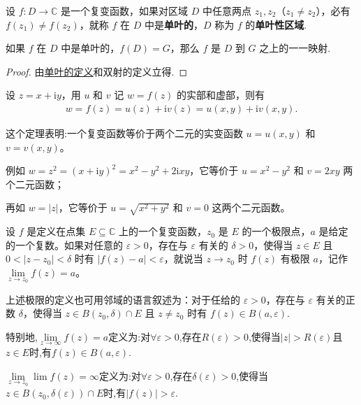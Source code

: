 \documentclass[../../main.tex]{subfiles}%
\begin{document}
\begin{definition}\label{definition:单叶性区域}
设 \( f:D \to \mathbb{C} \) 是一个复变函数，如果对区域 \( D \) 中任意两点 \( z_1, z_2 \)（\( z_1 \neq z_2 \)），必有 \( f(z_1) \neq f(z_2) \)，就称 \( f \) 在 \( D \) 中是\textbf{单叶的}，\( D \) 称为 \( f \) 的\textbf{单叶性区域}.
\end{definition}

\begin{proposition}
如果 \( f \) 在 \( D \) 中是单叶的，\( f(D) = G \)，那么 \( f \) 是 \( D \) 到 \( G \) 之上的一一映射.
\end{proposition}
\begin{proof}
由\hyperref[definition:单叶性区域]{单叶的定义}和双射的定义立得.
\end{proof}

\begin{theorem}
设 $z = x + \mathrm{i}y$，用 $u$ 和 $v$ 记 $w = f(z)$ 的实部和虚部，则有
\begin{align*}
w = f(z) = u(z) + \mathrm{i}v(z)= u(x, y) + \mathrm{i}v(x, y).
\end{align*}
\end{theorem}
\begin{remark}
这个定理表明:一个复变函数等价于两个二元的实变函数 $u = u(x, y)$ 和 $v = v(x, y)$。
\end{remark}
\begin{note}
例如 $w = z^2 = (x + \mathrm{i}y)^2 = x^2 - y^2 + 2\mathrm{i}xy$，它等价于 $u = x^2 - y^2$ 和 $v = 2xy$ 两个二元函数；

再如 $w = |z|$，它等价于 $u = \sqrt{x^2 + y^2}$ 和 $v = 0$ 这两个二元函数。
\end{note}

\begin{definition}
设 $f$ 是定义在点集 $E\subseteq \mathbb{C}$ 上的一个复变函数，$z_0$ 是 $E$ 的一个极限点，$a$ 是给定的一个复数。如果对任意的 $\varepsilon > 0$，存在与 $\varepsilon$ 有关的 $\delta > 0$，使得当 $z \in E$ 且 $0 < |z - z_0| < \delta$ 时有 $|f(z) - a| < \varepsilon$，就说当 $z \to z_0$ 时 $f(z)$ 有极限 $a$，记作 $\lim\limits_{z \to z_0} f(z) = a$。

上述极限的定义也可用邻域的语言叙述为：对于任给的 $\varepsilon > 0$，存在与 $\varepsilon$ 有关的正数 $\delta$，使得当 $z \in B(z_0, \delta) \cap E$ 且 $z \neq z_0$ 时有 $f(z) \in B(a, \varepsilon)$.

特别地,$\lim\limits_{z\rightarrow \infty}f\left( z \right) =a$定义为:对$\forall \varepsilon >0$,存在$R\left( \varepsilon \right) >0$,使得当$\left| z \right|>R\left( \varepsilon \right)$且$z\in E$时,有$f\left( z \right) \in B\left( a,\varepsilon \right).$

$\lim\limits_{z\rightarrow z_0}{\lim}f\left( z \right) =\infty$定义为:对$\forall \varepsilon >0$,存在$\delta \left( \varepsilon \right) >0$,使得当$z\in B\left( z_0,\delta \left( \varepsilon \right) \right) \cap E$时,有$\left| f\left( z \right) \right|>\varepsilon.$
\end{definition}
\end{document}
